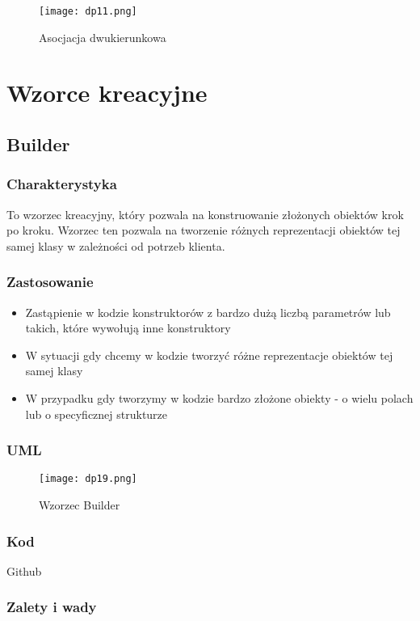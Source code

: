 \documentclass[a4paper,15pt]{article}
\begin{document}
\begin{figure}[H]
\centering
  \texttt{[image: dp11.png]}
  \caption{Asocjacja dwukierunkowa}
\end{figure}

\newpage
\section{Wzorce kreacyjne}

\subsection{Builder}

\subsubsection{Charakterystyka}
To wzorzec kreacyjny, który pozwala na konstruowanie złożonych obiektów krok po kroku. Wzorzec ten pozwala na tworzenie różnych reprezentacji obiektów tej samej klasy w zależności od potrzeb klienta. 

\subsubsection{Zastosowanie}
\begin{itemize}
\item Zastąpienie w kodzie konstruktorów z bardzo dużą liczbą parametrów lub takich, które wywołują inne konstruktory
\item W sytuacji gdy chcemy w kodzie tworzyć różne reprezentacje obiektów tej samej klasy
\item W przypadku gdy tworzymy w kodzie bardzo złożone obiekty - o wielu polach lub o specyficznej strukturze
\end{itemize}

\subsubsection{UML}

\begin{figure}[H]
\centering
  \texttt{[image: dp19.png]}
  \caption{Wzorzec Builder}
\end{figure}

\subsubsection{Kod}
Github

\subsubsection{Zalety i wady}
\end{document}
